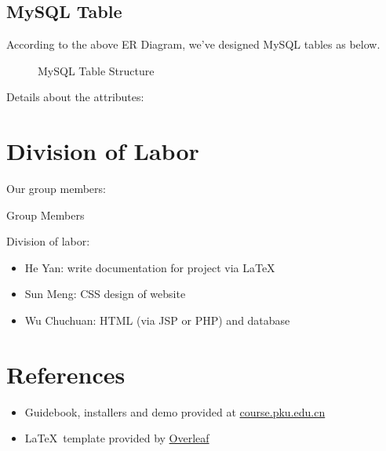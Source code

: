 \subsection{MySQL Table}

According to the above ER Diagram, we've designed MySQL tables as below.

\begin{figure}[htbp]
\begin{center}

\end{center}
\caption{MySQL Table Structure}
\end{figure}

Details about the attributes:



\section{Division of Labor}

Our group members:

\begin{table}[htbp]
	\begin{center}
		
	\end{center}
	\caption{Group Members}
\end{table}

Division of labor:

\begin{itemize}
	\item He Yan: write documentation for project via \LaTeX
	\item Sun Meng: CSS design of website
	\item Wu Chuchuan: HTML (via JSP or PHP) and database
\end{itemize}

\section{References}

\begin{itemize}
	\item Guidebook, installers and demo provided at \url{course.pku.edu.cn}
	\item \LaTeX \, template provided by \href{https://www.overleaf.com/latex/templates/project-template-titlepage/bwmhgfdvvhpw}{Overleaf}
\end{itemize}



